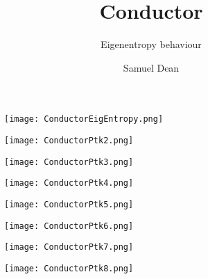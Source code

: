 \documentclass[pdf]{beamer}
\title{\textbf{Conductor}}
\subtitle{Eigenentropy behaviour}
\author{Samuel Dean}
\begin{document}
\begin{frame}
\titlepage
\end{frame}

\begin{frame}
\begin{figure}[!h]
\centering
\texttt{[image: ConductorEigEntropy.png]}
\end{figure}
\end{frame}

\begin{frame}
\begin{figure}[!h]
\centering
\texttt{[image: ConductorPtk2.png]}
\end{figure}
\end{frame}

\begin{frame}
\begin{figure}[!h]
\centering
\texttt{[image: ConductorPtk3.png]}
\end{figure}
\end{frame}

\begin{frame}
\begin{figure}[!h]
\centering
\texttt{[image: ConductorPtk4.png]}
\end{figure}
\end{frame}

\begin{frame}
\begin{figure}[!h]
\centering
\texttt{[image: ConductorPtk5.png]}
\end{figure}
\end{frame}

\begin{frame}
\begin{figure}[!h]
\centering
\texttt{[image: ConductorPtk6.png]}
\end{figure}
\end{frame}

\begin{frame}
\begin{figure}[!h]
\centering
\texttt{[image: ConductorPtk7.png]}
\end{figure}
\end{frame}

\begin{frame}
\begin{figure}[!h]
\centering
\texttt{[image: ConductorPtk8.png]}
\end{figure}
\end{frame}
\end{document}
